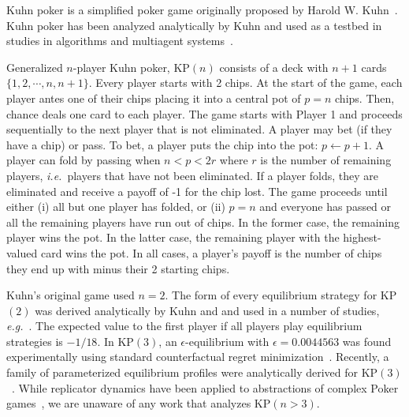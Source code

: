 \documentclass{aamas2014}
\newcommand{\ie}{{\it i.e.}}
\newcommand{\eg}{{\it e.g.}}
\begin{document}

Kuhn poker is a simplified poker game originally proposed by Harold W. Kuhn~\cite{Kuhn50}. 
Kuhn poker has been analyzed analytically by Kuhn and used as a testbed in studies in 
algorithms and multiagent systems~\cite{hoehn05,AbouRisk10,Szafron13Kuhn}.  

Generalized $n$-player Kuhn poker, KP$(n)$ consists of a deck with $n+1$ cards $\{ 1, 2, \cdots, n, n+1 \}$. 
Every player starts with 2 chips. At the start of the game, each player antes one of their chips placing it
into a central pot of $p = n$ chips. 
Then, chance deals one card to each player. 
The game starts with Player 1 and proceeds sequentially to the next player that is not eliminated. 
A player may bet (if they have a chip) or pass. 
To bet, a player puts the chip into the pot: $p \leftarrow p + 1$. 
A player can fold by passing when $n < p < 2r$ where $r$ is the number of remaining players, \ie~players that have not been eliminated. 
If a player folds, they are eliminated and receive a payoff of -1 for the chip lost. 
The game proceeds until either (i) all but one player has folded, or (ii) $p = n$ and everyone has passed or all the 
remaining players have run out of chips. 
In the former case, the remaining player wins the pot. In the latter case, the 
remaining player with the highest-valued card wins the pot. In all cases, a player's payoff is the number of chips
they end up with minus their 2 starting chips. 

Kuhn's original game used $n = 2$. The form of every equilibrium strategy for KP$(2)$ was derived analytically
by Kuhn and and used in a number of studies, \eg~\cite{hoehn05}. 
The expected value to the first player if all players play equilibrium strategies is $-1/18$. 
In KP$(3)$, an $\epsilon$-equilibrium with $\epsilon = 0.0044563$ was 
found experimentally using standard counterfactual regret minimization~\cite{AbouRisk10}. 
Recently, a family of parameterized equilibrium profiles were analytically derived for KP$(3)$~\cite{Szafron13Kuhn}.
While replicator dynamics have been applied to abstractions of complex Poker games~\cite{ponsen09b},
we are unaware of any work that analyzes KP$(n > 3)$.
\end{document}
